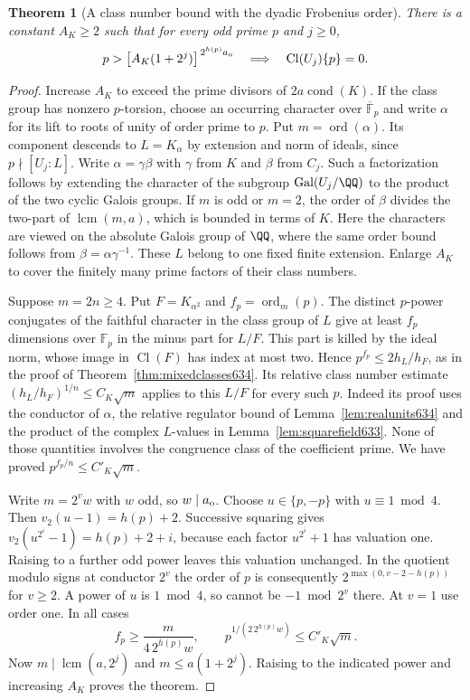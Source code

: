 \documentclass[a4paper,11pt]{article}
\newtheorem{theorem}[proposition]{Theorem}
\theoremstyle{definition}
\theoremstyle{remark}
\numberwithin{equation}{section}
\begin{document}
\begin{theorem}[A class number bound with the dyadic Frobenius order]
\leavevmode\label{thm:variableclasses642}
There is a constant \(A_K\ge2\) such that for every odd prime
\(p\) and \(j\ge0\),
\[
        p>\bigl[A_K(1+2^j)\bigr]^{\,2^{h(p)}a_{\rm o}}
              \quad\Longrightarrow\quad
                 \operatorname{Cl}(U_j)\{p\}=0 .
\]
\end{theorem}
\begin{proof}
Increase \(A_K\) to exceed the prime divisors of
\(2a\operatorname{cond}(K)\). If the class group has nonzero
\(p\)-torsion, choose an occurring character over
\(\overline{\mathbb F}_p\) and write \(\alpha\) for its lift to
roots of unity of order prime to \(p\). Put \(m=\operatorname{ord}
(\alpha)\). Its component descends to \(L=K_\alpha\) by extension
and norm of ideals, since \(p\nmid[U_j:L]\). Write
\(\alpha=\gamma\beta\) with \(\gamma\) from \(K\) and \(\beta\)
from \(C_j\). Such a factorization follows by extending the
character of the subgroup
\(\operatorname{Gal}(U_j/\QQ)\) to the product of the two cyclic
Galois groups. If \(m\) is odd or \(m=2\), the order of \(\beta\)
divides the two-part of \(\operatorname{lcm}(m,a)\), which is
bounded in terms of \(K\). Here the characters are viewed on
the absolute Galois group of \(\QQ\), where the same order
bound follows from \(\beta=\alpha\gamma^{-1}\). These \(L\)
belong to one fixed finite extension. Enlarge \(A_K\) to cover
the finitely many prime factors of their class numbers.

Suppose \(m=2n\ge4\). Put \(F=K_{\alpha^2}\) and
\(f_p=\operatorname{ord}_m(p)\). The distinct \(p\)-power
conjugates of the faithful character in the class group of \(L\)
give at least \(f_p\) dimensions over \(\mathbb F_p\) in the
minus part for \(L/F\). This part is killed by the ideal norm,
whose image in \(\operatorname{Cl}(F)\) has index at most two.
Hence \(p^{f_p}\le 2h_L/h_F\), as in the proof of
Theorem~\ref{thm:mixedclasses634}. Its relative class number
estimate
\((h_L/h_F)^{1/n}\le C_K\sqrt m\) applies to this \(L/F\)
for every such \(p\). Indeed its proof uses the conductor of
\(\alpha\), the relative regulator bound of
Lemma~\ref{lem:realunits634} and the product of the complex
\(L\)-values in Lemma~\ref{lem:squarefield633}. None of those
quantities involves the congruence class of the coefficient
prime. We have proved \(p^{f_p/n}\le C'_K\sqrt m\).

Write \(m=2^v w\) with \(w\) odd, so \(w\mid a_{\rm o}\).
Choose \(u\in\{p,-p\}\) with \(u\equiv1\bmod4\). Then
\(v_2(u-1)=h(p)+2\). Successive squaring gives
\(v_2(u^{2^i}-1)=h(p)+2+i\), because each factor
\(u^{2^i}+1\) has valuation one. Raising to a further odd
power leaves this valuation unchanged. In the quotient modulo
signs at conductor \(2^v\) the order of \(p\) is consequently
\(2^{\max(0,v-2-h(p))}\) for \(v\ge2\). A power of \(u\)
is \(1\bmod4\), so cannot be \(-1\bmod 2^v\) there. At
\(v=1\) use order one. In all cases
\[
           f_p\ge\frac{m}{4\,2^{h(p)}w},
       \qquad p^{1/(2\,2^{h(p)}w)}\le C'_K\sqrt m .
\]
Now \(m\mid\operatorname{lcm}(a,2^j)\) and
\(m\le a(1+2^j)\). Raising to the indicated power and
increasing \(A_K\) proves the theorem.
\end{proof}
\end{document}
